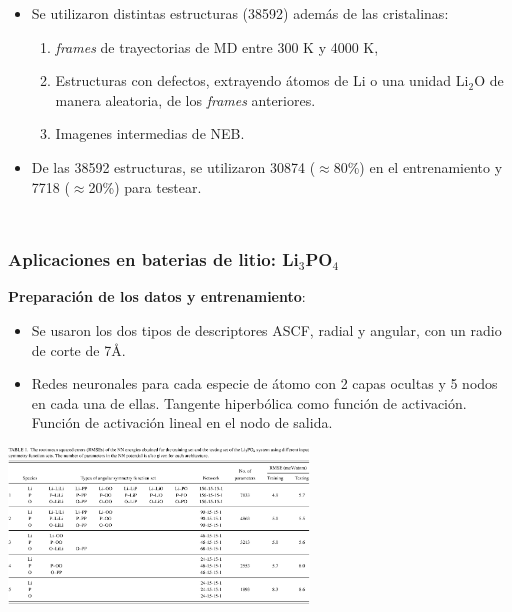 \documentclass[aspectratio=169]{beamer}
\let\oldtextbf\textbf
\renewcommand{\textbf}[1]{\textcolor{nordblue}{\oldtextbf{#1}}}
\begin{document}
\begin{frame}
\begin{columns}
\begin{itemize}
                \pause

                \item Se utilizaron distintas estructuras (38592) además de las 
                    cristalinas:
                    \begin{enumerate}
                        \item \textit{frames} de trayectorias de MD entre 300 K
                            y 4000 K,
                        \item Estructuras con defectos, extrayendo átomos de Li o
                            una unidad Li$_2$O de manera aleatoria, de los 
                            \textit{frames} anteriores.
                        \item Imagenes intermedias de NEB.
                    \end{enumerate}
                \item De las 38592 estructuras, se utilizaron 30874 
                    ($\approx$80\%) en el entrenamiento y 7718 ($\approx$20\%) 
                    para testear.
            \end{itemize}
        \end{columns}

    \end{frame}
    
    \begin{frame}
        \frametitle{Aplicaciones en baterias de litio: Li$_3$PO$_4$}
            
        \textbf{Preparación de los datos y entrenamiento}:
        \begin{itemize}
            \item Se usaron los dos tipos de descriptores ASCF, radial y angular, 
                con un radio de corte de 7\AA.
            \item Redes neuronales para cada especie de átomo con 2 capas ocultas
                y 5 nodos en cada una de ellas. Tangente hiperbólica como función
                de activación. Función de activación lineal en el nodo de salida.
        \end{itemize}

        \pause

        \begin{center}
            \includegraphics[width=0.6\textwidth]{Li3PO4-rmse.png}
        \end{center}

    \end{frame}
    
\end{document}
